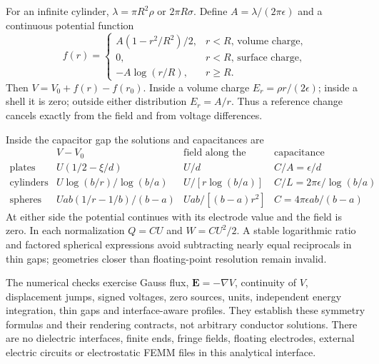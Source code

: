 For an infinite cylinder, $\lambda=\pi R^2\rho$ or $2\pi R\sigma$.
Define $A=\lambda/(2\pi\epsilon)$ and a continuous potential function
\[
 f(r)=\begin{cases}
 A(1-r^2/R^2)/2,&r<R\text{, volume charge},\\
 0,&r<R\text{, surface charge},\\
 -A\log(r/R),&r\ge R.
 \end{cases}
\]
Then $V=V_0+f(r)-f(r_0)$. Inside a volume charge $E_r=\rho r/(2\epsilon)$;
inside a shell it is zero; outside either distribution $E_r=A/r$.
Thus a reference change cancels exactly from the field and from voltage differences.

Inside the capacitor gap the solutions and capacitances are
\[
\begin{array}{cccc}
 & V-V_0 & \text{field along the normal} & \text{capacitance}\\\hline
\text{plates} & U(1/2-\xi/d) & U/d & C/A=\epsilon/d\\
\text{cylinders} & U\log(b/r)/\log(b/a) & U/[r\log(b/a)]
 & C/L=2\pi\epsilon/\log(b/a)\\
\text{spheres} & Uab(1/r-1/b)/(b-a) & Uab/[(b-a)r^2]
 & C=4\pi\epsilon ab/(b-a)
\end{array}
\]
At either side the potential continues with its electrode value and the field
is zero. In each normalization $Q=CU$ and $W=CU^2/2$. A stable logarithmic ratio
and factored spherical expressions avoid subtracting nearly equal reciprocals
in thin gaps; geometries closer than floating-point resolution remain invalid.

The numerical checks exercise Gauss flux, $\mathbf E=-\nabla V$, continuity of
$V$, displacement jumps, signed voltages, zero sources, units, independent
energy integration, thin gaps and interface-aware profiles. They establish
these symmetry formulas and their rendering contracts, not arbitrary conductor
solutions. There are no dielectric interfaces, finite ends, fringe fields,
floating electrodes, external electric circuits or electrostatic FEMM files
in this analytical interface.
